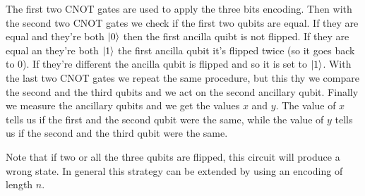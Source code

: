 \documentclass{article}
\begin{document}
	The first two CNOT gates are used to apply the three bits encoding. Then with the second two CNOT gates we check if the first two qubits are equal. If they are equal and they're both $\ket{0}$ then the first ancilla quibt is not flipped. If they are equal an they're both $\ket{1}$ the first ancilla qubit it's flipped twice (so it goes back to 0). If they're different the ancilla qubit is flipped and so it is set to $\ket{1}$. With the last two CNOT gates we repeat the same procedure, but this thy we compare the second and the third qubits and we act on the second ancillary qubit. Finally we measure the ancillary qubits and we get the values $x$ and $y$. The value of $x$ tells us if the first and the second qubit were the same, while the value of $y$ tells us if the second and the third qubit were the same. 

	Note that if two or all the three qubits are flipped, this circuit will produce a wrong state. In general this strategy can be extended by using an encoding of length $n$. 
\end{document}
